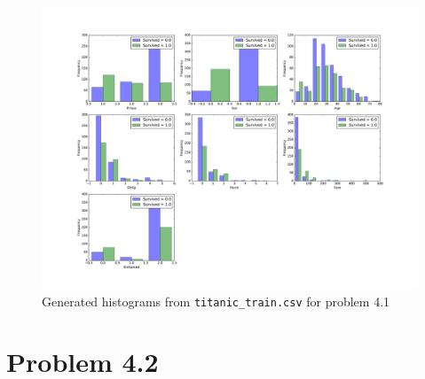 \documentclass[12pt]{article}
\begin{document}
\begin{figure}[H]
        \begin{adjustwidth}{-10in}{-10in}
                \begin{center}
                        \includegraphics[width=8.5in,height=\textheight,keepaspectratio]{code/src/histograms}
                        \caption{Generated histograms from \texttt{titanic\_train.csv} for problem 4.1}
                \end{center}
        \end{adjustwidth}
\end{figure}

\section*{Problem 4.2}
\end{document}
